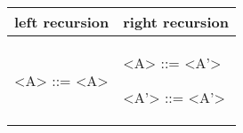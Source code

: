 \begin{center}
	\begin{tabular}{p{5cm} | p{5cm}}
		left recursion
		&
		right recursion
		\\
		\hline
		
		\begin{grammarEx}
			<A> ::= <A> \textcolor{red}{\textalpha}
			\alt \textcolor{blue}{\textbeta}
		\end{grammarEx}
		
		&
		
		\begin{grammarEx}
			<A> ::= \textcolor{blue}{\textbeta} <A'>
			
			<A'> ::= \textcolor{red}{\textalpha} <A'>
			\alt \textepsilon
		\end{grammarEx}
		
	\end{tabular}
\end{center}